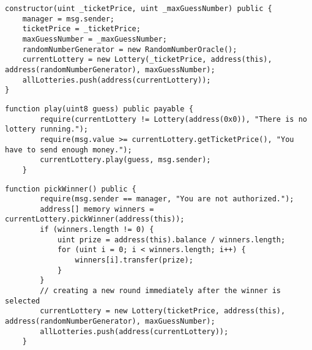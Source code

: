 \begin{Verbatim}[fontsize=\small]
constructor(uint _ticketPrice, uint _maxGuessNumber) public {
    manager = msg.sender;
    ticketPrice = _ticketPrice;
    maxGuessNumber = _maxGuessNumber;
    randomNumberGenerator = new RandomNumberOracle();
    currentLottery = new Lottery(_ticketPrice, address(this), address(randomNumberGenerator), maxGuessNumber);
    allLotteries.push(address(currentLottery));
}
\end{Verbatim}

\begin{Verbatim}[fontsize=\small]
    function play(uint8 guess) public payable {
        require(currentLottery != Lottery(address(0x0)), "There is no lottery running.");
        require(msg.value >= currentLottery.getTicketPrice(), "You have to send enough money.");
        currentLottery.play(guess, msg.sender);
    }
\end{Verbatim}

\begin{Verbatim}[fontsize=\small]
    function pickWinner() public {
        require(msg.sender == manager, "You are not authorized.");
        address[] memory winners = currentLottery.pickWinner(address(this));
        if (winners.length != 0) {
            uint prize = address(this).balance / winners.length;
            for (uint i = 0; i < winners.length; i++) {
                winners[i].transfer(prize);
            }
        }
        // creating a new round immediately after the winner is selected
        currentLottery = new Lottery(ticketPrice, address(this), address(randomNumberGenerator), maxGuessNumber);
        allLotteries.push(address(currentLottery));
    }
\end{Verbatim}
